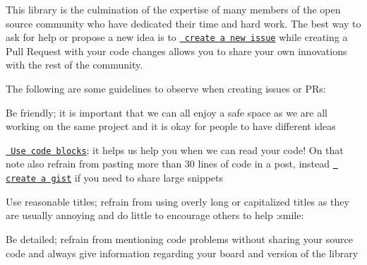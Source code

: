 This library is the culmination of the expertise of many members of the open source community who have dedicated their time and hard work. The best way to ask for help or propose a new idea is to \href{https://github.com/adafruit/Adafruit_NeoPixel/issues/new}{\texttt{ create a new issue}} while creating a Pull Request with your code changes allows you to share your own innovations with the rest of the community.

The following are some guidelines to observe when creating issues or PRs\+:


\begin{DoxyItemize}
\item Be friendly; it is important that we can all enjoy a safe space as we are all working on the same project and it is okay for people to have different ideas
\item \href{https://github.com/adam-p/markdown-here/wiki/Markdown-Cheatsheet\#code}{\texttt{ Use code blocks}}; it helps us help you when we can read your code! On that note also refrain from pasting more than 30 lines of code in a post, instead \href{https://gist.github.com/}{\texttt{ create a gist}} if you need to share large snippets
\item Use reasonable titles; refrain from using overly long or capitalized titles as they are usually annoying and do little to encourage others to help \+:smile\+:
\item Be detailed; refrain from mentioning code problems without sharing your source code and always give information regarding your board and version of the library 
\end{DoxyItemize}